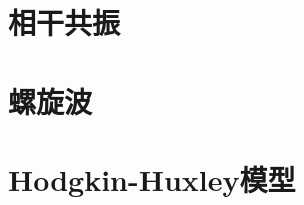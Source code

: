 \documentclass[
bachelor,
nofont, %
pdflinks,
]{xjtuthesis}
\begin{document}
\section{相干共振}

\section{螺旋波}

\section{Hodgkin-Huxley模型}

\newcommand{\ai}{\alpha_i}
\newcommand{\am}{\alpha_m}
\newcommand{\an}{\alpha_n}
\newcommand{\ah}{\alpha_h}

\newcommand{\ambar}{\overline{\am}}
\newcommand{\anbar}{\overline{\an}}
\newcommand{\ahbar}{\overline{\an}}

\newcommand{\bi}{\beta_i}
\newcommand{\bm}{\beta_m}
\newcommand{\bn}{\beta_n}
\newcommand{\bh}{\beta_h}

\newcommand{\bmbar}{\overline{\bm}}
\newcommand{\bnbar}{\overline{\bn}}
\newcommand{\bhbar}{\overline{\bn}}

\newcommand{\go}{G_{\omega}}
\newcommand{\gna}{G_{Na}}
\newcommand{\gk}{G_{K}}
\newcommand{\gl}{G_{l}}

\newcommand{\gobar}{\overline{g_{\omega}}}
\newcommand{\gnabar}{\overline{g_{Na}}}
\newcommand{\gkbar}{\overline{g_{K}}}
\newcommand{\glbar}{\overline{g_l}}

\newcommand{\vna}{V_{Na}}
\newcommand{\vk}{V_{K}}
\newcommand{\vl}{V_{l}}

\newcommand{\vmbar}{\overline{V_m}}
\newcommand{\vnbar}{\overline{V_n}}
\newcommand{\vhbar}{\overline{V_h}}
\end{document}
